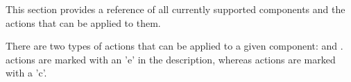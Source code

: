 
This section provides a reference of all currently supported \gdaut
components and the actions that can be applied to them. 

There are two types of actions that can be applied to a given component:  and . 
 actions are marked with an 'e' in the description,
whereas  actions are marked with a 'c'.
